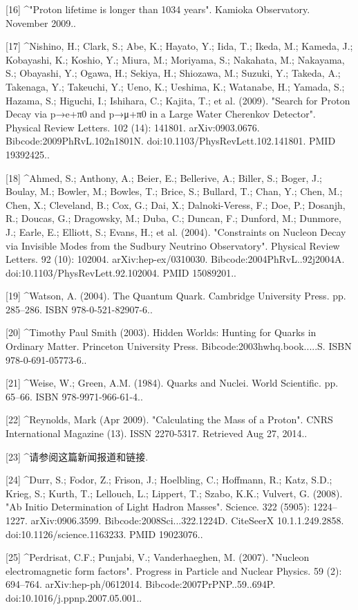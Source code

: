 [16]
^"Proton lifetime is longer than 1034 years". Kamioka Observatory. November 2009..

[17]
^Nishino, H.; Clark, S.; Abe, K.; Hayato, Y.; Iida, T.; Ikeda, M.; Kameda, J.; Kobayashi, K.; Koshio, Y.; Miura, M.; Moriyama, S.; Nakahata, M.; Nakayama, S.; Obayashi, Y.; Ogawa, H.; Sekiya, H.; Shiozawa, M.; Suzuki, Y.; Takeda, A.; Takenaga, Y.; Takeuchi, Y.; Ueno, K.; Ueshima, K.; Watanabe, H.; Yamada, S.; Hazama, S.; Higuchi, I.; Ishihara, C.; Kajita, T.; et al. (2009). "Search for Proton Decay via p→e+π0 and p→μ+π0 in a Large Water Cherenkov Detector". Physical Review Letters. 102 (14): 141801. arXiv:0903.0676. Bibcode:2009PhRvL.102n1801N. doi:10.1103/PhysRevLett.102.141801. PMID 19392425..

[18]
^Ahmed, S.; Anthony, A.; Beier, E.; Bellerive, A.; Biller, S.; Boger, J.; Boulay, M.; Bowler, M.; Bowles, T.; Brice, S.; Bullard, T.; Chan, Y.; Chen, M.; Chen, X.; Cleveland, B.; Cox, G.; Dai, X.; Dalnoki-Veress, F.; Doe, P.; Dosanjh, R.; Doucas, G.; Dragowsky, M.; Duba, C.; Duncan, F.; Dunford, M.; Dunmore, J.; Earle, E.; Elliott, S.; Evans, H.; et al. (2004). "Constraints on Nucleon Decay via Invisible Modes from the Sudbury Neutrino Observatory". Physical Review Letters. 92 (10): 102004. arXiv:hep-ex/0310030. Bibcode:2004PhRvL..92j2004A. doi:10.1103/PhysRevLett.92.102004. PMID 15089201..

[19]
^Watson, A. (2004). The Quantum Quark. Cambridge University Press. pp. 285–286. ISBN 978-0-521-82907-6..

[20]
^Timothy Paul Smith (2003). Hidden Worlds: Hunting for Quarks in Ordinary Matter. Princeton University Press. Bibcode:2003hwhq.book.....S. ISBN 978-0-691-05773-6..

[21]
^Weise, W.; Green, A.M. (1984). Quarks and Nuclei. World Scientific. pp. 65–66. ISBN 978-9971-966-61-4..

[22]
^Reynolds, Mark (Apr 2009). "Calculating the Mass of a Proton". CNRS International Magazine (13). ISSN 2270-5317. Retrieved Aug 27, 2014..

[23]
^请参阅这篇新闻报道和链接.

[24]
^Durr, S.; Fodor, Z.; Frison, J.; Hoelbling, C.; Hoffmann, R.; Katz, S.D.; Krieg, S.; Kurth, T.; Lellouch, L.; Lippert, T.; Szabo, K.K.; Vulvert, G. (2008). "Ab Initio Determination of Light Hadron Masses". Science. 322 (5905): 1224–1227. arXiv:0906.3599. Bibcode:2008Sci...322.1224D. CiteSeerX 10.1.1.249.2858. doi:10.1126/science.1163233. PMID 19023076..

[25]
^Perdrisat, C.F.; Punjabi, V.; Vanderhaeghen, M. (2007). "Nucleon electromagnetic form factors". Progress in Particle and Nuclear Physics. 59 (2): 694–764. arXiv:hep-ph/0612014. Bibcode:2007PrPNP..59..694P. doi:10.1016/j.ppnp.2007.05.001..

